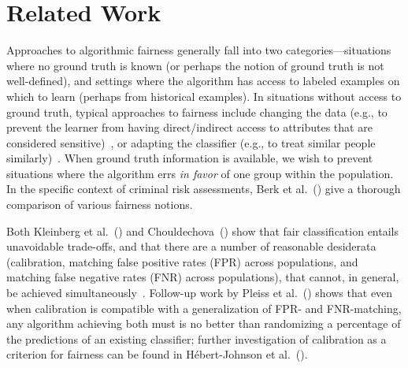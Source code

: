 \section{Related Work}

Approaches to algorithmic fairness generally fall into two categories---situations where no ground truth is known (or perhaps the notion of ground truth is not well-defined), and settings where the algorithm has access to labeled examples on which to learn (perhaps from historical examples). In situations without access to ground truth, typical approaches to fairness include changing the data (e.g., to prevent the learner from having direct/indirect access to attributes that are considered sensitive)~\cite{fairrepresentations,certifying,wordembeddings}, or adapting the classifier (e.g., to treat similar people similarly)~\cite{fairnessthroughawareness, fairnessbandits, kamishima}. When ground truth information is available, we wish to prevent situations where the algorithm errs {\em in favor} of one group within the population. In the specific context of criminal risk assessments, Berk et al.~(\citeyear{stateoftheart}) give a thorough comparison of various fairness notions. 
 

Both Kleinberg et al.~(\citeyear{inherent}) and Chouldechova~(\citeyear{chouldechova}) show that fair classification entails unavoidable trade-offs, and that there are a number of reasonable desiderata (calibration, matching false positive rates (FPR) across populations, and matching false negative rates (FNR) across populations), that cannot, in general, be achieved simultaneously~\cite{biasinevitable}. Follow-up work by Pleiss et al.~(\citeyear{calibration}) shows that even when calibration is compatible with a generalization of FPR- and FNR-matching, any algorithm achieving both must is no better than randomizing a percentage of the predictions of an existing classifier; further investigation of calibration as a criterion for fairness can be found in H{\'{e}}bert-Johnson et al.~(\citeyear{calibrationformasses}).

